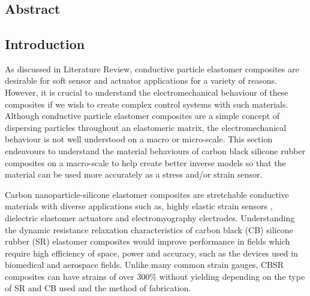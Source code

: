 \chapter{\chapiiiname}
\label{chapter3}

\section*{Abstract}




\section{Introduction}
As discussed in Literature Review, conductive particle elastomer composites are desirable for soft sensor and actuator applications for a variety of reasons. However, it is crucial to understand the electromechanical behaviour of these composites if we wish to create complex control systems with such materials. Although conductive particle elastomer composites are a simple concept of dispersing particles throughout an elastomeric matrix, the electromechanical behaviour is not well understood on a macro or micro-scale. This section endeavours to understand the material behaviours of carbon black silicone rubber composites on a macro-scale to help create better inverse models so that the material can be used more accurately as a stress and/or strain sensor. 

Carbon nanoparticle-silicone elastomer composites are stretchable conductive materials with diverse applications such as, highly elastic strain sensors \cite{Lacasse2010,Spahr2017,Kim2018}, dielectric elastomer actuators \cite{Henke2018,Liu2009} and electromyography electrodes\cite{Carpi2010,Kim2018,Mouri2019}. Understanding the dynamic resistance relaxation characteristics of carbon black (CB) silicone rubber (SR) elastomer composites would improve performance in fields which require high efficiency of space, power and accuracy, such as the devices used in biomedical and aerospace fields. Unlike many common strain gauges, CBSR composites can have strains of over 300\% without yielding\cite{Wang2010} depending on the type of SR and CB used and the method of fabrication. 

